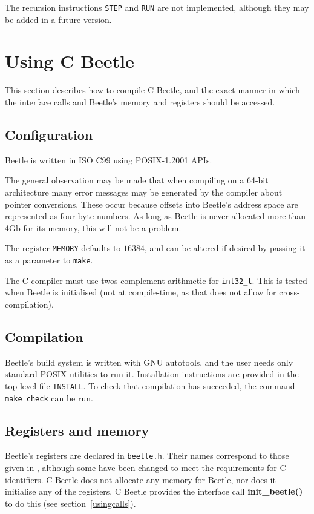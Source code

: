\documentclass{article}
\begin{document}
The recursion instructions {\tt STEP} and {\tt RUN} are not implemented,
although they may be added in a future version.


\section{Using C Beetle}

This section describes how to compile C Beetle, and the exact manner in which
the interface calls and Beetle's memory and registers should be accessed.


\subsection{Configuration}
\label{configuration}

Beetle is written in ISO C99 using POSIX-1.2001 APIs.

The general observation may be made that when compiling on
a 64-bit architecture many error messages may be generated by the
compiler about pointer conversions. These occur because offsets into Beetle's
address space are represented as four-byte numbers. As long as Beetle is
never allocated more than 4Gb for its memory, this will not be a problem.

The register {\tt MEMORY} defaults to $16384$, and can be altered if
desired by passing it as a parameter to {\tt make}.

The C compiler must use twos-complement arithmetic for {\tt int32\_t}.
This is tested when Beetle is initialised (not at compile-time, as
that does not allow for cross-compilation).


\subsection{Compilation}

Beetle's build system is written with GNU autotools, and the user
needs only standard POSIX utilities to run it. Installation
instructions are provided in the top-level file {\tt INSTALL}. To
check that compilation has succeeded, the command {\tt make check} can
be run.


\subsection{Registers and memory}

Beetle's registers are declared in {\tt beetle.h}. Their names correspond to
those given in \cite[section~2.1]{beetle}, although some have been changed
to meet the requirements for C identifiers. C Beetle does not allocate any
memory for Beetle, nor does it initialise any of the registers. C Beetle
provides the interface call {\bf init\_beetle()} to do this (see
section~\ref{usingcalls}).
\end{document}
